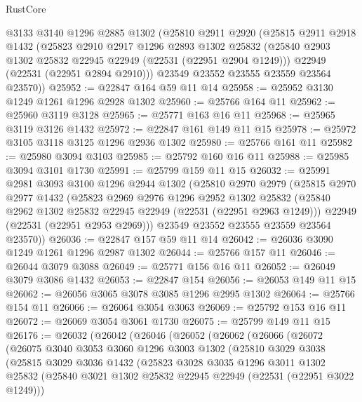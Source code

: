 \begin{lexlean}{RustCore}
\begin{coremodule}
    @3133
    @3140
    @1296
    @2885
    @1302
    (@25810
      @2911
      @2920
      (@25815
        @2911
        @2918
        @1432
        (@25823
          @2910
          @2917
          @1296
          @2893
          @1302
          @25832
          (@25840 @2903 @1302 @25832 @22945 @22949 (@22531 (@22951 @2904 @1249)))
          @22949
          (@22531 (@22951 @2894 @2910)))
        @23549
        @23552
        @23555
        @23559
        @23564
        @23570))
@25952 := @22847 @164 @59 @11 @14
@25958 := @25952 @3130 @1249 @1261 @1296 @2928 @1302
@25960 := @25766 @164 @11
@25962 := @25960 @3119 @3128
@25965 := @25771 @163 @16 @11
@25968 := @25965 @3119 @3126 @1432
@25972 := @22847 @161 @149 @11 @15
@25978 := @25972 @3105 @3118 @3125 @1296 @2936 @1302
@25980 := @25766 @161 @11
@25982 := @25980 @3094 @3103
@25985 := @25792 @160 @16 @11
@25988 := @25985 @3094 @3101 @1730
@25991 := @25799 @159 @11 @15
@26032 := @25991
    @2981
    @3093
    @3100
    @1296
    @2944
    @1302
    (@25810
      @2970
      @2979
      (@25815
        @2970
        @2977
        @1432
        (@25823
          @2969
          @2976
          @1296
          @2952
          @1302
          @25832
          (@25840 @2962 @1302 @25832 @22945 @22949 (@22531 (@22951 @2963 @1249)))
          @22949
          (@22531 (@22951 @2953 @2969)))
        @23549
        @23552
        @23555
        @23559
        @23564
        @23570))
@26036 := @22847 @157 @59 @11 @14
@26042 := @26036 @3090 @1249 @1261 @1296 @2987 @1302
@26044 := @25766 @157 @11
@26046 := @26044 @3079 @3088
@26049 := @25771 @156 @16 @11
@26052 := @26049 @3079 @3086 @1432
@26053 := @22847 @154
@26056 := @26053 @149 @11 @15
@26062 := @26056 @3065 @3078 @3085 @1296 @2995 @1302
@26064 := @25766 @154 @11
@26066 := @26064 @3054 @3063
@26069 := @25792 @153 @16 @11
@26072 := @26069 @3054 @3061 @1730
@26075 := @25799 @149 @11 @15
@26176 := @26032
    (@26042
      (@26046
        (@26052
          (@26062
            (@26066
              (@26072
                (@26075
                  @3040
                  @3053
                  @3060
                  @1296
                  @3003
                  @1302
                  (@25810
                    @3029
                    @3038
                    (@25815
                      @3029
                      @3036
                      @1432
                      (@25823
                        @3028
                        @3035
                        @1296
                        @3011
                        @1302
                        @25832
                        (@25840 @3021 @1302 @25832 @22945 @22949 (@22531 (@22951 @3022 @1249)))

\end{coremodule}
\end{lexlean}
